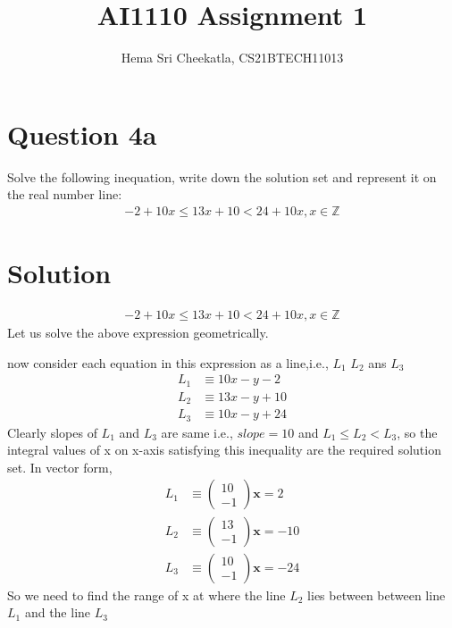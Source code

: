 \documentclass[16pt, a4paper, two column]{article}
\title{AI1110 Assignment 1}
\author{Hema Sri Cheekatla, CS21BTECH11013}
\newcommand{\myvec}[1]{\ensuremath{\begin{pmatrix}#1\end{pmatrix}}}
\let\vec\mathbf
\begin{document}
\maketitle
\section*{Question 4a}
Solve the following inequation, write down the solution set and represent it on the real number line:
\begin{align*}
  -2 + 10x \leq 13x + 10 < 24 + 10x,  x\in \mathbb{Z} 
\end{align*}
\section*{Solution}
\begin{align*}
  -2 + 10x \leq 13x + 10 < 24 + 10x,  x\in \mathbb{Z} 
\end{align*}
\noindent Let us solve the above expression geometrically.

now consider each equation in this expression as a line,i.e., $L_1$ $L_2$ ans $L_3$
\begin{align*}
L_1 &\equiv 10x-y-2  \\
L_2 &\equiv 13x-y+10 \\
L_3 &\equiv 10x-y+24
\end{align*}
Clearly slopes of $L_1$ and $L_3$ are same i.e., $slope = 10$\newline
and $L_1 \leq L_2 < L_3 $, so the integral values of x on x-axis satisfying this inequality are the required solution set.
In vector form,
\begin{align*}
	L_1 &\equiv \myvec{10 \\ -1}\vec{x} = 2 \\
	L_2 &\equiv \myvec{13 \\ -1} \vec{x} = -10 \\
	L_3 &\equiv \myvec{10 \\ -1}\vec{x} = -24
\end{align*}
So we need to find the range of x at where the line $L_2$ lies between between line $L_1$ and the line $L_3$
\end{document}
